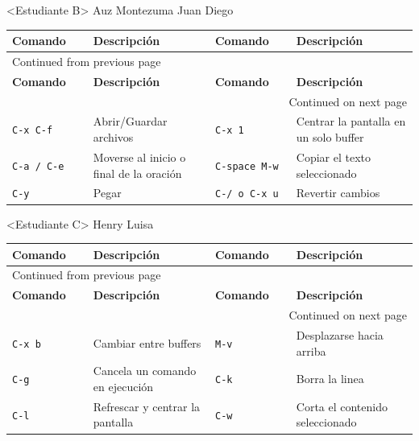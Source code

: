 \documentclass{article}
\begin{document}
<Estudiante B> Auz Montezuma Juan Diego
\begin{longtable}{|p{0.2\linewidth}|p{0.3\linewidth}|p{0.2\linewidth}|p{0.3\linewidth}|}
\textbf{Comando} & \textbf{Descripción} & \textbf{Comando} & \textbf{Descripción}\\[0pt]
\hline
\endfirsthead
\multicolumn{4}{l}{Continued from previous page} \\[0pt]
\hline

\textbf{Comando} & \textbf{Descripción} & \textbf{Comando} & \textbf{Descripción} \\[0pt]

\hline
\endhead
\hline\multicolumn{4}{r}{Continued on next page} \\
\endfoot
\endlastfoot
\hline
\texttt{C-x C-f} & Abrir/Guardar archivos & \texttt{C-x 1} & Centrar la pantalla en un solo buffer\\[0pt]
\texttt{C-a / C-e} & Moverse al inicio o final de la oración & \texttt{C-space M-w} & Copiar el texto seleccionado\\[0pt]
\texttt{C-y} & Pegar & \texttt{C-/ o C-x u} & Revertir cambios\\[0pt]
\end{longtable}

<Estudiante C> Henry Luisa
\begin{longtable}{|p{0.2\linewidth}|p{0.3\linewidth}|p{0.2\linewidth}|p{0.3\linewidth}|}
\textbf{Comando} & \textbf{Descripción} & \textbf{Comando} & \textbf{Descripción}\\[0pt]
\hline
\endfirsthead
\multicolumn{4}{l}{Continued from previous page} \\[0pt]
\hline

\textbf{Comando} & \textbf{Descripción} & \textbf{Comando} & \textbf{Descripción} \\[0pt]

\hline
\endhead
\hline\multicolumn{4}{r}{Continued on next page} \\
\endfoot
\endlastfoot
\hline
\texttt{C-x b} & Cambiar entre buffers & \texttt{M-v} & Desplazarse hacia arriba\\[0pt]
\texttt{C-g} & Cancela un comando en ejecución & \texttt{C-k} & Borra la linea\\[0pt]
\texttt{C-l} & Refrescar y centrar la pantalla & \texttt{C-w} & Corta el contenido seleccionado\\[0pt]
\end{longtable}
\end{document}
